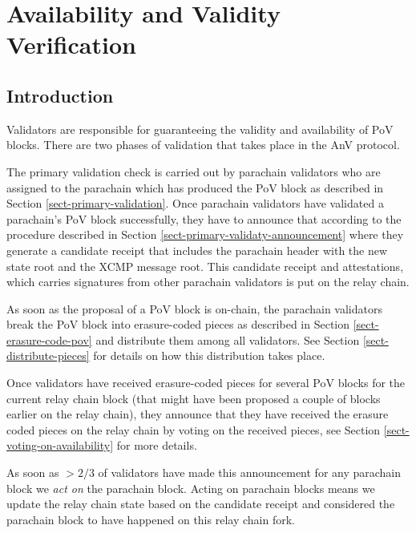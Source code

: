 \chapter{Availability and Validity Verification}

\section{Introduction}

Validators are responsible for guaranteeing the validity and availability of PoV blocks.
There are two phases of validation that takes place in the AnV protocol.
\newline

The primary validation check is carried out by parachain validators who are assigned to the parachain which has produced the PoV block as described in Section \ref{sect-primary-validation}. Once parachain validators have validated a parachain's PoV block successfully, they have to announce that according to the procedure described in Section \ref{sect-primary-validaty-announcement} where they generate a candidate receipt that includes the parachain header with the new state root and the XCMP message root. This candidate receipt and attestations, which carries signatures from other parachain validators is put on the relay chain.
\newline

As soon as the proposal of a PoV block is on-chain, the parachain validators break the PoV block into erasure-coded pieces as described in Section \ref{sect-erasure-code-pov} and distribute them among all validators. See Section \ref{sect-distribute-pieces} for details on how this distribution takes place.
\newline

Once validators have received erasure-coded pieces for several PoV blocks for the current relay chain block (that might have been proposed a couple of blocks earlier on the relay chain), they announce that they have received the erasure coded pieces on the relay chain by voting on the received pieces, see Section \ref{sect-voting-on-availability} for more details.
\newline

As soon as $>2/3$ of validators have made this announcement for any parachain block we \emph{act on} the parachain block. Acting on parachain blocks means we update the relay chain state based on the candidate receipt and considered the parachain block to have happened on this relay chain fork.
\newline

